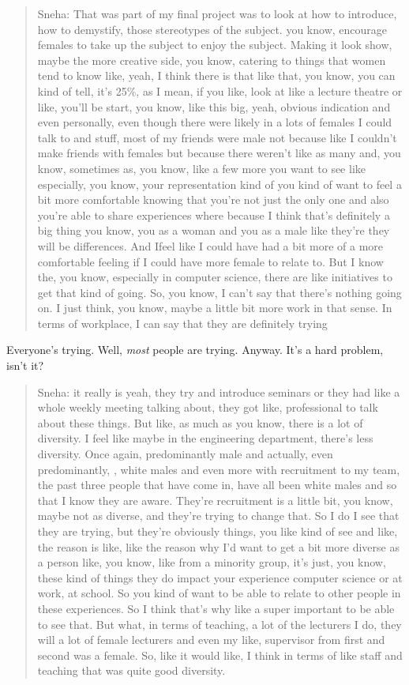 \documentclass[
]{book}
\begin{document}
\begin{quote}
Sneha: That was part of my final project was to look at how to introduce, how to demystify, those stereotypes of the subject. you know, encourage females to take up the subject to enjoy the subject. Making it look show, maybe the more creative side, you know, catering to things that women tend to know like, yeah, I think there is that like that, you know, you can kind of tell, it's 25\%, as I mean, if you like, look at like a lecture theatre or like, you'll be start, you know, like this big, yeah, obvious indication and even personally, even though there were likely in a lots of females I could talk to and stuff, most of my friends were male not because like I couldn't make friends with females but because there weren't like as many and, you know, sometimes as, you know, like a few more you want to see like especially, you know, your representation kind of you kind of want to feel a bit more comfortable knowing that you're not just the only one and also you're able to share experiences where because I think that's definitely a big thing you know, you as a woman and you as a male like they're they will be differences. And Ifeel like I could have had a bit more of a more comfortable feeling if I could have more female to relate to. But I know the, you know, especially in computer science, there are like initiatives to get that kind of going. So, you know, I can't say that there's nothing going on. I just think, you know, maybe a little bit more work in that sense. In terms of workplace, I can say that they are definitely trying
\end{quote}

Everyone's trying. Well, \emph{most} people are trying. Anyway. It's a hard problem, isn't it?

\begin{quote}
Sneha: it really is yeah, they try and introduce seminars or they had like a whole weekly meeting talking about, they got like, professional to talk about these things. But like, as much as you know, there is a lot of diversity. I feel like maybe in the engineering department, there's less diversity. Once again, predominantly male and actually, even predominantly, , white males and even more with recruitment to my team, the past three people that have come in, have all been white males and so that I know they are aware. They're recruitment is a little bit, you know, maybe not as diverse, and they're trying to change that. So I do I see that they are trying, but they're obviously things, you like kind of see and like, the reason is like, like the reason why I'd want to get a bit more diverse as a person like, you know, like from a minority group, it's just, you know, these kind of things they do impact your experience computer science or at work, at school. So you kind of want to be able to relate to other people in these experiences. So I think that's why like a super important to be able to see that. But what, in terms of teaching, a lot of the lecturers I do, they will a lot of female lecturers and even my like, supervisor from first and second was a female. So, like it would like, I think in terms of like staff and teaching that was quite good diversity.
\end{quote}
\end{document}
